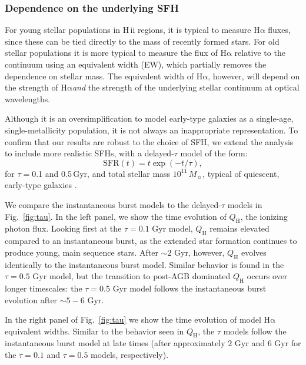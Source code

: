\documentclass[preprint2]{aastex62}
\newcommand{\hii}{H\,{\sc ii}\xspace}
\newcommand\Msun{\ensuremath{\,M_{\sun}}\xspace}
\newcommand{\ha}{\ensuremath{\mathrm{H\alpha}}\xspace}
\newcommand{\QH}{\ensuremath{Q_{\mathrm{H}}}\xspace}
\newcommand{\Gyr}{$\,$Gyr\xspace}
\begin{document}
\subsubsection{Dependence on the underlying SFH} \label{sec:stars:emis:continuum}

For young stellar populations in \hii regions, it is typical to measure \ha fluxes, since these can be tied directly to the mass of recently formed stars. For old stellar populations it is more typical to measure the flux of \ha relative to the continuum using an equivalent width (EW), which partially removes the dependence on stellar mass. The equivalent width of \ha, however, will depend on the strength of \ha \emph{and} the strength of the underlying stellar continuum at optical wavelengths. %

Although it is an oversimplification to model early-type galaxies as a single-age, single-metallicity population, it is not always an inappropriate representation. To confirm that our results are robust to the choice of SFH, we extend the analysis to include more realistic SFHs, with a delayed-$\tau$ model of the form:
\begin{equation}
    \mathrm{SFR}(t) = t \exp (-t/\tau),
\end{equation}
for $\tau = $0.1 and 0.5\Gyr, and total stellar mass $10^{11}$\Msun, typical of quiescent, early-type galaxies \citep{Thomas+2005, Choi+2014}.

We compare the instantaneous burst models to the delayed-$\tau$ models in Fig.~\ref{fig:tau}. In the left panel, we show the time evolution of \QH, the ionizing photon flux. Looking first at the $\tau=0.1\,$\Gyr model, \QH remains elevated compared to an instantaneous burst, as the extended star formation continues to produce young, main sequence stars. After ${\sim}2\,$\Gyr, however, \QH evolves identically to the instantaneous burst model. Similar behavior is found in the $\tau=0.5\,$\Gyr model, but the transition to post-AGB dominated \QH occurs over longer timescales: the $\tau=0.5\,$\Gyr model follows the instantaneous burst evolution after ${\sim}5-6\,$\Gyr. 

In the right panel of Fig.~\ref{fig:tau} we show the time evolution of model \ha equivalent widths. Similar to the behavior seen in \QH, the $\tau$ models follow the instantaneous burst model at late times (after approximately $2\,$\Gyr and $6\,$\Gyr for the $\tau=0.1$ and $\tau=0.5$ models, respectively). 
\end{document}
